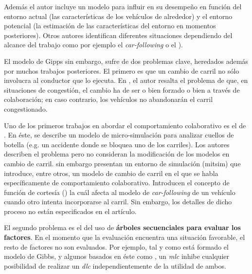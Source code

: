 Además el autor incluye un modelo para influir en su desempeño en función del entorno actual (las características de los vehículos de alrededor) y el entorno potencial (la estimación de las características del entorno en momentos posteriores). Otros autores identifican diferentes situaciones dependiendo del alcance del trabajo como por ejemplo el \textit{\gls{car-following}} o el \textit{} \cite{Toledo2003, Liu2013}).

El modelo de Gipps sin embargo, sufre de dos problemas clave, heredados además por muchos trabajos posteriores. El primero es que un cambio de carril no sólo involucra al conductor que lo ejecuta. En \cite{hidas2002modelling}, el autor resalta el problema de que, en situaciones de congestión, el cambio ha de ser o bien forzado o bien a través de colaboración; en caso contrario, los vehículos no abandonarán el carril congestionado.

Uno de los primeros trabajos en abordar el comportamiento colaborativo es el de \cite{Fritzsche1994}. En éste, se describe un modelo de micro-simulación para analizar cuellos de botella (e.g. un accidente donde se bloquea uno de los carriles). Los autores describen el problema pero no consideran la modificación de los modelos en cambio de carril. \cite{Yang1996} sin embargo presentan un entorno de simulación (\gls{mitsim}) que introduce, entre otros, un modelo de cambio de carril en el que se habla específicamente de comportamiento colaborativo. Introducen el concepto de función de cortesía (\textit{}) la cuál afecta al modelo de \textit{\gls{car-following}} de un vehículo cuando otro intenta incorporarse al carril. Sin embargo, los detalles de dicho proceso no están especificados en el artículo.

El segundo problema es el del uso de \textbf{árboles secuenciales para evaluar los factores}. En el momento que la evaluación encuentra una situación favorable, el resto de factores no son evaluados. Por ejemplo, tal y como está formado el modelo de Gibbs, y algunos basados en éste como \cite{hidas2002modelling}, un \textit{\Acrshort{mlc}} inhibe cualquier posibilidad de realizar un \textit{\Acrshort{dlc}} independientemente de la utilidad de ambos.


